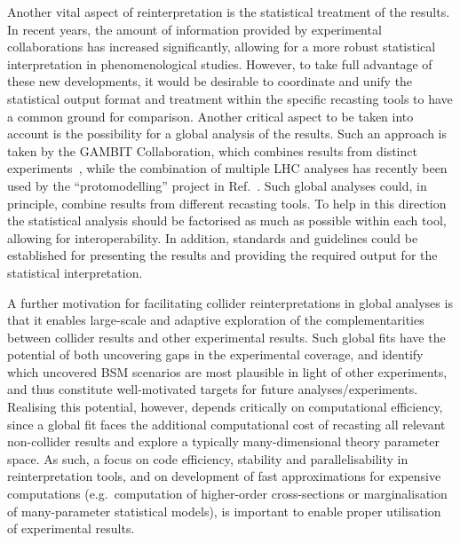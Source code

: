 \documentclass[11pt]{article}
\begin{document}
Another vital aspect of reinterpretation is the statistical treatment of the results. In recent years, the amount of information provided by experimental collaborations has increased significantly, allowing for a more robust statistical interpretation in phenomenological studies. However, to take full advantage of these new developments, it would be desirable to coordinate and unify the statistical output format and treatment within the specific recasting tools to have a common ground for comparison. Another critical aspect to be taken into account is the possibility for a global analysis of the results. Such an approach is taken by the GAMBIT Collaboration, which combines results from distinct experiments~\cite{Kvellestad:2019vxm}, while the combination of multiple \gls{LHC} analyses has recently been used by the ``protomodelling'' project in Ref.~\cite{Waltenberger:2020ygp}. Such global analyses could, in principle, combine results from different recasting tools.
To help in this direction the statistical analysis should be factorised as much as possible within each tool, allowing for interoperability. In addition,  standards and guidelines could be established for presenting the results and providing the required output for the statistical interpretation.

A further motivation for facilitating collider reinterpretations in global analyses is that it enables large-scale and adaptive exploration of the complementarities between collider results and other experimental results. Such global fits have the potential of both uncovering gaps in the experimental coverage, and identify which uncovered \gls{BSM} scenarios are most plausible in light of other experiments, and thus constitute well-motivated targets for future analyses/experiments. Realising this potential, however, depends critically on computational efficiency, since a global fit faces the additional computational cost of \gls{recasting} all relevant non-collider results and explore a typically many-dimensional theory parameter space. As such, a focus on code efficiency, stability and parallelisability in reinterpretation tools, and on development of fast approximations for expensive computations (e.g.~computation of higher-order cross-sections or marginalisation of many-parameter statistical models), is important to enable proper utilisation of experimental results.
\end{document}

